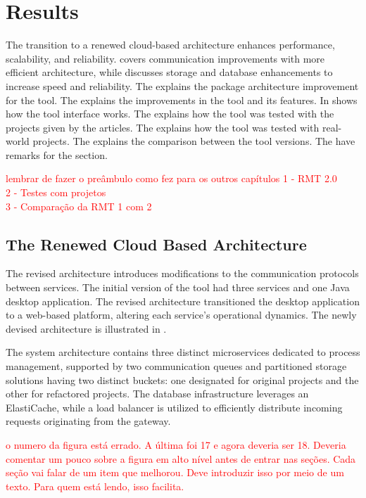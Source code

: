 \chapter{Results}
\label{results}
The  transition to a renewed cloud-based architecture enhances performance, scalability, and reliability.  covers communication improvements with more efficient architecture, while  discusses storage and database enhancements to increase speed and reliability. The  explains the package architecture improvement for the tool. The  explains the improvements in the tool and its features. In  shows how the tool interface works. The  explains how the tool was tested with the projects given by the articles. The  explains how the tool was tested with real-world projects.
The  explains the comparison between the tool versions. The  have remarks for the section.


\textcolor{red}{lembrar de fazer o preâmbulo como fez para os outros capítulos
1 - RMT 2.0\\
2 - Testes com projetos\\
3 - Comparação da RMT 1 com 2
}

\section{The Renewed Cloud Based Architecture}
\label{sec-cloud}
The revised architecture introduces modifications to the communication protocols between services. The initial version of the tool had three services and one Java desktop application. The revised architecture transitioned the desktop application to a web-based platform, altering each service's operational dynamics. The newly devised architecture is illustrated in .

The system architecture contains three distinct microservices dedicated to process management, supported by two communication queues and partitioned storage solutions having two distinct buckets: one designated for original projects and the other for refactored projects. The database infrastructure leverages an ElastiCache, while a load balancer is utilized to efficiently distribute incoming requests originating from the gateway.


\textcolor{red}{o numero da figura está errado. A última foi 17 e agora deveria ser 18. Deveria comentar um pouco sobre a figura em alto nível antes de entrar nas seções. Cada seção vai falar de um item que melhorou. Deve introduzir isso por meio de um texto. Para quem está lendo, isso facilita.}

